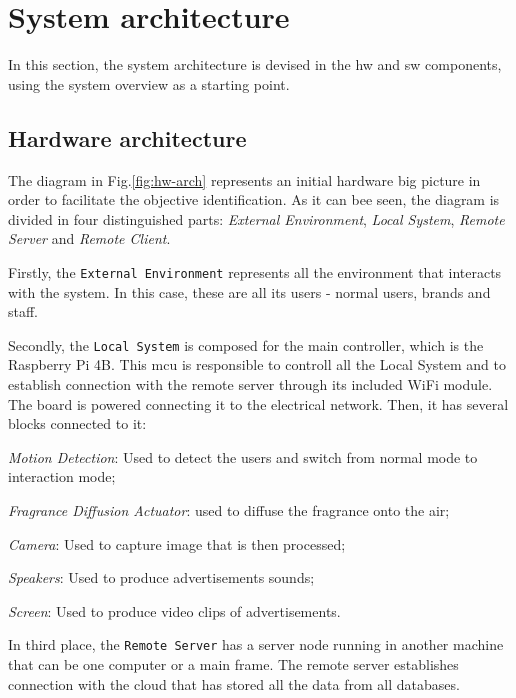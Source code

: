 %
\section{System architecture}
\label{sec:system-architecture}
In this section, the system architecture is devised in the \gls{hw} and \gls{sw} components, using the system overview as a starting point. 

\subsection{Hardware architecture}
\label{sec:hardw-arch}
%
The diagram in Fig.\ref{fig:hw-arch} represents an initial hardware big picture in order to facilitate the objective identification.
As it can bee seen, the diagram is divided in four distinguished parts: \emph{External Environment}, \emph{Local System}, \emph{Remote Server} and \emph{Remote Client}.

Firstly, the \texttt{External Environment} represents all the environment that interacts with the system. In this case, these are all its users - normal users, brands and staff.

Secondly, the \texttt{Local System} is composed for the main controller, which is the Raspberry Pi 4B. 
This \gls{mcu} is responsible to controll all the Local System and to establish connection with the remote server through its included WiFi module. 
The board is powered connecting it to the electrical network. 
Then, it has several blocks connected to it:
%
\begin{item-c}
\item \emph{Motion Detection}: Used to detect the users and switch from normal mode to interaction mode;
\item \emph{Fragrance Diffusion Actuator}: used to diffuse the fragrance onto the air;
\item \emph{Camera}: Used to capture image that is then processed;
\item \emph{Speakers}: Used to produce advertisements sounds;
\item \emph{Screen}: Used to produce video clips of advertisements.
\end{item-c}
%

In third place, the \texttt{Remote Server} has a server node running in another machine that can be one computer or a main frame.
The remote server establishes connection with the cloud that has stored all the data from all databases.

